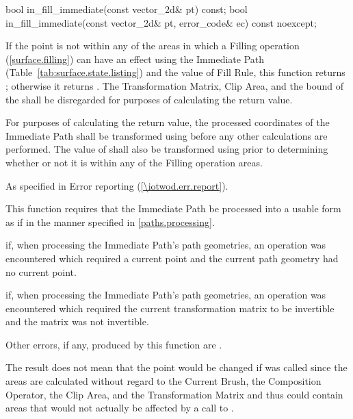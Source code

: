 \begin{itemdecl}
bool in_fill_immediate(const vector_2d& pt) const;
bool in_fill_immediate(const vector_2d& pt, error_code& ec) const noexcept;
\end{itemdecl}
\begin{itemdescr}
\pnum
\returns
If the point  is not within any of the areas in which a Filling operation (\ref{surface.filling}) can have an effect using the Immediate Path (Table~\ref{tab:surface.state.listing}) and the value of Fill Rule, this function returns ; otherwise it returns . The Transformation Matrix, Clip Area, and the bound of the \underlyingsurface shall be disregarded for purposes of calculating the return value.

\pnum
For purposes of calculating the return value, the processed coordinates of the Immediate Path shall be transformed using  before any other calculations are performed. The value of  shall also be transformed using  prior to determining whether or not it is within any of the Filling operation areas.

\pnum
\throws
As specified in Error reporting (\ref{\iotwod.err.report}).

\pnum
\remarks
This function requires that the Immediate Path be processed into a usable form as if in the manner specified in \ref{paths.processing}.

\pnum
\errors
{} if, when processing the Immediate Path's path geometries, an operation was encountered which required a current point and the current path geometry had no current point.

\pnum
{} if, when processing the Immediate Path's path geometries, an operation was encountered which required the current transformation matrix to be invertible and the matrix was not invertible.

\pnum
Other errors, if any, produced by this function are .

\pnum
\realnotes
The result does not mean that the point  would be changed if  was called since the areas are calculated without regard to the Current Brush, the Composition Operator, the Clip Area, and the Transformation Matrix and thus could contain areas that would not actually be affected by a call to .
\end{itemdescr}

